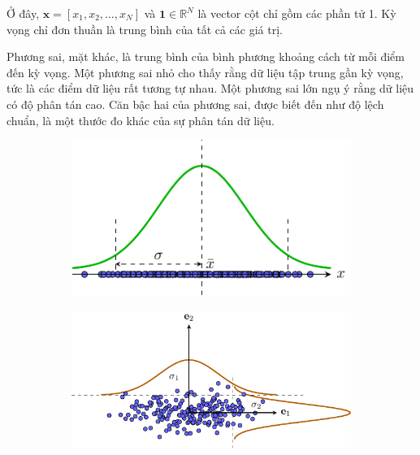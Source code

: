 \documentclass[12pt,a4paper,oneside]{report}
\numberwithin{equation}{section}
\begin{document}
Ở đây, $\mathbf{x}=\left[x_1, x_2, \ldots, x_N\right]$ và $\mathbf{1} \in \mathbb{R}^N$ là vector cột chỉ gồm các phần tử 1. Kỳ vọng chỉ đơn thuần là trung bình của tất cả các giá trị.

Phương sai, mặt khác, là trung bình của bình phương khoảng cách từ mỗi điểm đến kỳ vọng. Một phương sai nhỏ cho thấy rằng dữ liệu tập trung gần kỳ vọng, tức là các điểm dữ liệu rất tương tự nhau. Một phương sai lớn ngụ ý rằng dữ liệu có độ phân tán cao. Căn bậc hai của phương sai, được biết đến như độ lệch chuẩn, là một thước đo khác của sự phân tán dữ liệu.

\begin{figure}[t]
	\begin{subfigure}{0.325\textwidth}
		\includegraphics[width=0.99\linewidth]{var_1d.pdf}
		\caption{}
		\label{fig:27_2a}
	\end{subfigure}
	\begin{subfigure}{0.325\textwidth}
		\includegraphics[width=0.99\linewidth]{pca_diagvar.pdf}
		\caption{}
		\label{fig:27_2b}
	\end{subfigure}
	\begin{subfigure}{0.325\textwidth}

\end{subfigure}
\end{figure}
\end{document}
